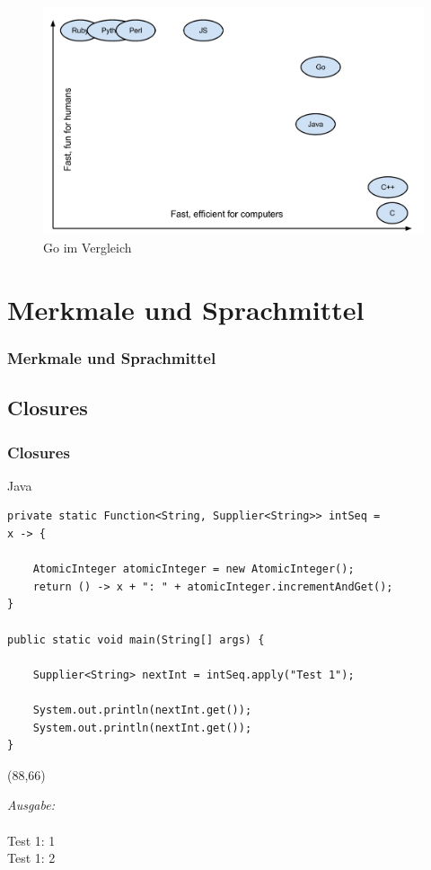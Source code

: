 \documentclass{beamer}
\begin{document}
\begin{frame}

\begin{figure}
\includegraphics[scale=0.3]{graph.png}
\caption{Go im Vergleich}
\end{figure}

\end{frame}


\section{Merkmale und Sprachmittel}
\begin{frame}
\frametitle{Merkmale und Sprachmittel}
\end{frame}


\subsection{Closures}
\begin{frame}[fragile]
\frametitle{Closures}

Java
\lstset{language=Java, basicstyle=\scriptsize}
\begin{lstlisting}
private static Function<String, Supplier<String>> intSeq = 
x -> {

    AtomicInteger atomicInteger = new AtomicInteger();
    return () -> x + ": " + atomicInteger.incrementAndGet();
}

public static void main(String[] args) {

    Supplier<String> nextInt = intSeq.apply("Test 1");

    System.out.println(nextInt.get());
    System.out.println(nextInt.get());
}
\end{lstlisting}

\begin{textblock}{36}(88,66)
\begin{tcolorbox}
\textit{Ausgabe:\\}\\
Test 1: 1 \\
Test 1: 2
\end{tcolorbox}
\end{textblock}

\end{frame}
\end{document}
